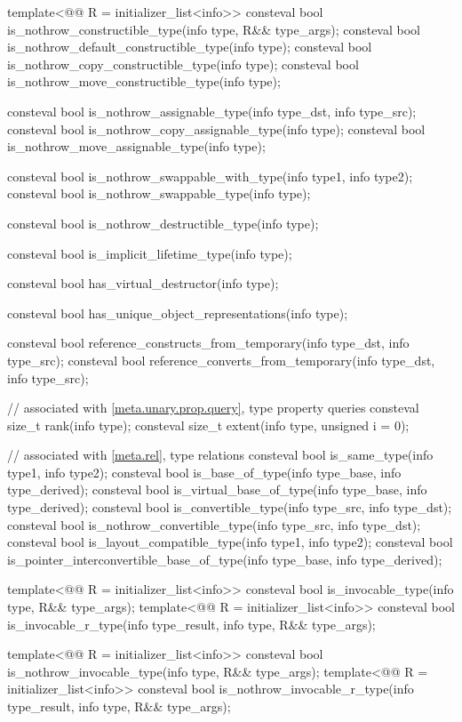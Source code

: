 \begin{codeblock}
{  template<@@ R = initializer_list<info>>
    consteval bool is_nothrow_constructible_type(info type, R&& type_args);
  consteval bool is_nothrow_default_constructible_type(info type);
  consteval bool is_nothrow_copy_constructible_type(info type);
  consteval bool is_nothrow_move_constructible_type(info type);

  consteval bool is_nothrow_assignable_type(info type_dst, info type_src);
  consteval bool is_nothrow_copy_assignable_type(info type);
  consteval bool is_nothrow_move_assignable_type(info type);

  consteval bool is_nothrow_swappable_with_type(info type1, info type2);
  consteval bool is_nothrow_swappable_type(info type);

  consteval bool is_nothrow_destructible_type(info type);

  consteval bool is_implicit_lifetime_type(info type);

  consteval bool has_virtual_destructor(info type);

  consteval bool has_unique_object_representations(info type);

  consteval bool reference_constructs_from_temporary(info type_dst, info type_src);
  consteval bool reference_converts_from_temporary(info type_dst, info type_src);

  // associated with \ref{meta.unary.prop.query}, type property queries
  consteval size_t rank(info type);
  consteval size_t extent(info type, unsigned i = 0);

  // associated with \ref{meta.rel}, type relations
  consteval bool is_same_type(info type1, info type2);
  consteval bool is_base_of_type(info type_base, info type_derived);
  consteval bool is_virtual_base_of_type(info type_base, info type_derived);
  consteval bool is_convertible_type(info type_src, info type_dst);
  consteval bool is_nothrow_convertible_type(info type_src, info type_dst);
  consteval bool is_layout_compatible_type(info type1, info type2);
  consteval bool is_pointer_interconvertible_base_of_type(info type_base, info type_derived);

  template<@@ R = initializer_list<info>>
    consteval bool is_invocable_type(info type, R&& type_args);
  template<@@ R = initializer_list<info>>
    consteval bool is_invocable_r_type(info type_result, info type, R&& type_args);

  template<@@ R = initializer_list<info>>
    consteval bool is_nothrow_invocable_type(info type, R&& type_args);
  template<@@ R = initializer_list<info>>
    consteval bool is_nothrow_invocable_r_type(info type_result, info type, R&& type_args);

}
\end{codeblock}
